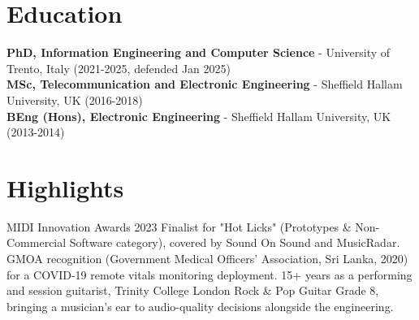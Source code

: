 \documentclass[11pt]{article}
\begin{document}
\section*{Education}
\textbf{PhD, Information Engineering and Computer Science} - University of Trento, Italy (2021-2025, defended Jan 2025) \\
\textbf{MSc, Telecommunication and Electronic Engineering} - Sheffield Hallam University, UK (2016-2018) \\
\textbf{BEng (Hons), Electronic Engineering} - Sheffield Hallam University, UK (2013-2014)

\section*{Highlights}
MIDI Innovation Awards 2023 Finalist for "Hot Licks" (Prototypes \& Non-Commercial Software category), covered by Sound On Sound and MusicRadar. GMOA recognition (Government Medical Officers' Association, Sri Lanka, 2020) for a COVID-19 remote vitals monitoring deployment. 15+ years as a performing and session guitarist, Trinity College London Rock \& Pop Guitar Grade 8, bringing a musician's ear to audio-quality decisions alongside the engineering.
\end{document}
